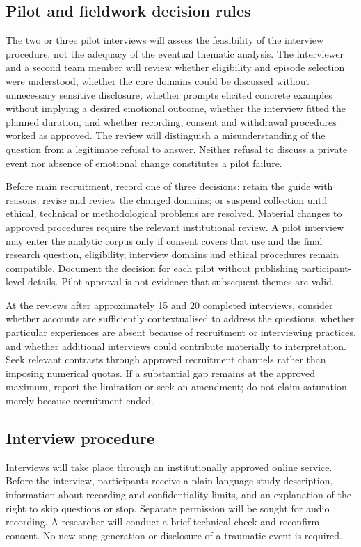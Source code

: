 \subsection{Pilot and fieldwork decision rules}
The two or three pilot interviews will assess the feasibility of the interview procedure, not the adequacy of the eventual thematic analysis. The interviewer and a second team member will review whether eligibility and episode selection were understood, whether the core domains could be discussed without unnecessary sensitive disclosure, whether prompts elicited concrete examples without implying a desired emotional outcome, whether the interview fitted the planned duration, and whether recording, consent and withdrawal procedures worked as approved. The review will distinguish a misunderstanding of the question from a legitimate refusal to answer. Neither refusal to discuss a private event nor absence of emotional change constitutes a pilot failure.

Before main recruitment, record one of three decisions: retain the guide with reasons; revise and review the changed domains; or suspend collection until ethical, technical or methodological problems are resolved. Material changes to approved procedures require the relevant institutional review. A pilot interview may enter the analytic corpus only if consent covers that use and the final research question, eligibility, interview domains and ethical procedures remain compatible. Document the decision for each pilot without publishing participant-level details. Pilot approval is not evidence that subsequent themes are valid.

At the reviews after approximately 15 and 20 completed interviews, consider whether accounts are sufficiently contextualised to address the questions, whether particular experiences are absent because of recruitment or interviewing practices, and whether additional interviews could contribute materially to interpretation. Seek relevant contrasts through approved recruitment channels rather than imposing numerical quotas. If a substantial gap remains at the approved maximum, report the limitation or seek an amendment; do not claim saturation merely because recruitment ended.

\subsection{Interview procedure}
Interviews will take place through an institutionally approved online service. Before the interview, participants receive a plain-language study description, information about recording and confidentiality limits, and an explanation of the right to skip questions or stop. Separate permission will be sought for audio recording. A researcher will conduct a brief technical check and reconfirm consent. No new song generation or disclosure of a traumatic event is required.

